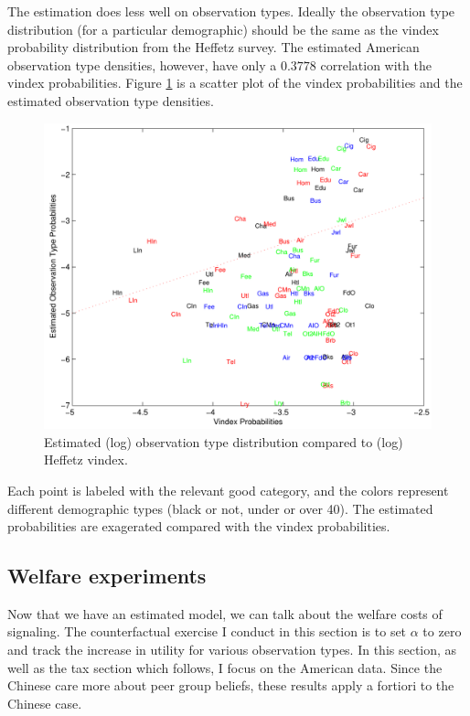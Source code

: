 \documentclass[12pt]{article}
\begin{document}
The estimation does less well on observation types.
Ideally the observation type distribution (for a particular demographic) should be the same as the vindex probability distribution from the Heffetz survey.
The estimated American observation type densities, however, have only a $0.3778$ correlation with the vindex probabilities.
Figure \ref{fig:vinmatch} is a scatter plot of the vindex probabilities and the estimated observation type densities.
\begin{figure}
    \centering
	\includegraphics[scale=.8]{pics/vinmatch_cropped.pdf}
    \caption{Estimated (log) observation type distribution compared to (log) Heffetz vindex.}
    \label{fig:vinmatch}
\end{figure}
Each point is labeled with the relevant good category, and the colors represent different demographic types (black or not, under or over 40).
The estimated probabilities are exagerated compared with the vindex probabilities.

\subsection{Welfare experiments}
Now that we have an estimated model, we can talk about the welfare costs of signaling.
The counterfactual exercise I conduct in this section is to set $\alpha$ to zero and track the increase in utility for various observation types.
In this section, as well as the tax section which follows, I focus on the American data.  Since the Chinese care more about peer group beliefs, these results apply a fortiori to the Chinese case.
\end{document}
